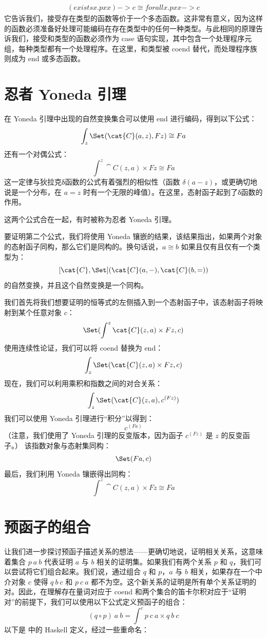 \begin{align}
(exists x. p x x) -> c \ensuremath{\cong} forall x. p x x -> c
\end{align}
它告诉我们，接受存在类型的函数等价于一个多态函数。这非常有意义，因为这样的函数必须准备好处理可能编码在存在类型中的任何一种类型。与此相同的原理告诉我们，接受和类型的函数必须作为 case 语句实现，其中包含一个处理程序元组，每种类型都有一个处理程序。在这里，和类型被 coend 替代，而处理程序族则成为 end 或多态函数。

\section{忍者 Yoneda 引理}

在 Yoneda 引理中出现的自然变换集合可以使用 end 进行编码，得到以下公式：
\[\int_z \Set(\cat{C}(a, z), F z) \cong F a\]
还有一个对偶公式：
\[\int^z \cat{C}(z, a)\times{}F z \cong F a\]
这一定律与狄拉克δ函数的公式有着强烈的相似性（函数 $\delta(a - z)$，或更确切地说是一个分布，在 $a = z$ 时有一个无限的峰值）。在这里，态射函子起到了δ函数的作用。

这两个公式合在一起，有时被称为忍者 Yoneda 引理。

要证明第二个公式，我们将使用 Yoneda 镶嵌的结果，该结果指出，如果两个对象的态射函子同构，那么它们是同构的。换句话说，$a \cong b$ 如果且仅有且仅有一个类型为：
\[[\cat{C}, \Set](\cat{C}(a, -), \cat{C}(b, =))\]
的自然变换，并且这个自然变换是一个同构。

我们首先将我们想要证明的恒等式的左侧插入到一个态射函子中，该态射函子将映射到某个任意对象 $c$：
\[\Set(\int^z \cat{C}(z, a)\times{}F z, c)\]
使用连续性论证，我们可以将 coend 替换为 end：
\[\int_z \Set(\cat{C}(z, a)\times{}F z, c)\]
现在，我们可以利用乘积和指数之间的对合关系：
\[\int_z \Set(\cat{C}(z, a), c^{(F z)})\]
我们可以使用 Yoneda 引理进行“积分”以得到：
\[c^{(F a)}\]
（注意，我们使用了 Yoneda 引理的反变版本，因为函子 $c^{(F z)}$ 是 $z$ 的反变函子。）
该指数对象与态射集同构：
\[\Set(F a, c)\]
最后，我们利用 Yoneda 镶嵌得出同构：
\[\int^z \cat{C}(z, a)\times{}F z \cong F a\]

\section{预函子的组合}

让我们进一步探讨预函子描述关系的想法——更确切地说，证明相关关系，这意味着集合 $p\ a\ b$ 代表证明 $a$ 与 $b$ 相关的证明集。如果我们有两个关系 $p$ 和 $q$，我们可以尝试将它们组合起来。我们说，通过组合 $q$ 和 $p$，$a$ 与 $b$ 相关，如果存在一个中介对象 $c$ 使得 $q\ b\ c$ 和 $p\ c\ a$ 都不为空。这个新关系的证明是所有单个关系证明的对。因此，在理解存在量词对应于 coend 和两个集合的笛卡尔积对应于“证明对”的前提下，我们可以使用以下公式定义预函子的组合：
\[(q \circ p)\ a\ b = \int^c p\ c\ a\times{}q\ b\ c\]
以下是  中的 Haskell 定义，经过一些重命名：


